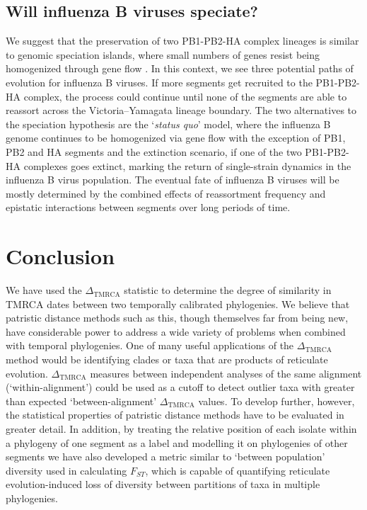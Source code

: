 \documentclass[11pt,oneside,letterpaper]{article}
\newcommand{\dtmrca}{\Delta_\mathrm{TMRCA}}
\begin{document}
\subsection*{Will influenza B viruses speciate?}
We suggest that the preservation of two PB1-PB2-HA complex lineages is similar to genomic speciation islands, where small numbers of genes resist being homogenized through gene flow \citep{turner2005}.
In this context, we see three potential paths of evolution for influenza B viruses.
If more segments get recruited to the PB1-PB2-HA complex, the process could continue until none of the segments are able to reassort across the Victoria--Yamagata lineage boundary.
The two alternatives to the speciation hypothesis are the `\textit{status quo}' model, where the influenza B genome continues to be homogenized via gene flow with the exception of PB1, PB2 and HA segments and the extinction scenario, if one of the two PB1-PB2-HA complexes goes extinct, marking the return of single-strain dynamics in the influenza B virus population.
The eventual fate of influenza B viruses will be mostly determined by the combined effects of reassortment frequency and epistatic interactions between segments over long periods of time.

\section*{Conclusion}
We have used the $\dtmrca$ statistic to determine the degree of similarity in TMRCA dates between two temporally calibrated phylogenies.
We believe that patristic distance methods such as this, though themselves far from being new, have considerable power to address a wide variety of problems when combined with temporal phylogenies.
One of many useful applications of the $\dtmrca$ method would be identifying clades or taxa that are products of reticulate evolution.
$\dtmrca$ measures between independent analyses of the same alignment (`within-alignment') could be used as a cutoff to detect outlier taxa with greater than expected `between-alignment' $\dtmrca$ values.
To develop further, however, the statistical properties of patristic distance methods have to be evaluated in greater detail.
In addition, by treating the relative position of each isolate within a phylogeny of one segment as a label and modelling it on phylogenies of other segments we have also developed a metric similar to `between population' diversity used in calculating $F_{ST}$, which is capable of quantifying reticulate evolution-induced loss of diversity between partitions of taxa in multiple phylogenies.
\end{document}
